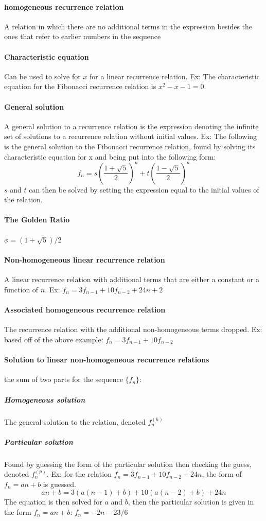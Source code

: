 \documentclass[a4paper]{article}
\begin{document}
\paragraph{homogeneous recurrence relation} A relation in which there are no additional terms in the expression besides the ones that refer to earlier numbers in the sequence
\paragraph{Characteristic equation} Can be used to solve for $x$ for a linear recurrence relation. Ex: The characteristic equation for the Fibonacci recurrence relation is $x^2 - x - 1 = 0$.
\paragraph{General solution} A general solution to a recurrence relation is the expression denoting the infinite set of solutions to a recurrence relation without initial values. Ex: The following is the general solution to the Fibonacci recurrence relation, found by solving its characteristic equation for x and being put into the following form:
\begin{equation*}
  f_n = s\left(\frac{1 + \sqrt 5}{2}\right)^n +
  t \left(\frac{1 - \sqrt 5}{2}\right)^n
\end{equation*}
$s$ and $t$ can then be solved by setting the expression equal to the initial values of the relation.
\paragraph{The Golden Ratio} $\phi = (1 + \sqrt 5) / 2$
\paragraph{Non-homogeneous linear recurrence relation} A linear recurrence relation with additional terms that are either a constant or a function of $n$. Ex: $f_n = 3 f_{n-1} + 10 f_{n-2} + 24n + 2$
\paragraph{Associated homogeneous recurrence relation} The recurrence relation with the additional non-homogeneous terms dropped. Ex: based off of the above example: $f_n = 3 f_{n-1} + 10 f_{n-2}$
\paragraph{Solution to linear non-homogeneous recurrence relations} the sum of two parts for the sequence $\{f_n\}$:
\subparagraph{Homogeneous solution} The general solution to the relation, denoted $f_n^{(h)}$
\subparagraph{Particular solution} Found by guessing the form of the particular solution then checking the guess, denoted $f_n^{(p)}$. Ex: for the relation $f_n = 3 f_{n-1} + 10 f_{n-2} + 24n$, the form of $f_n = an + b$ is guessed. 
\begin{equation*}
an + b = 3(a(n-1)+b)+10(a(n-2)+b) + 24n
\end{equation*}
The equation is then solved for $a$ and $b$, then the particular solution is given in the form $f_n = an + b$: $f_n = -2n -23/6$
\end{document}
